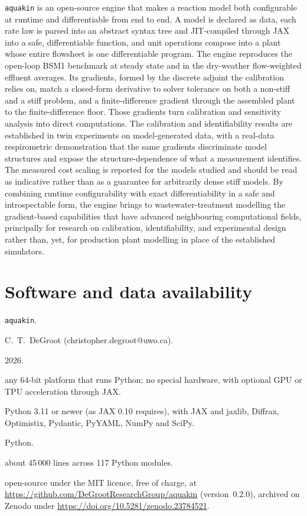 \documentclass{article}
\begin{document}
\texttt{aquakin} is an open-source engine that makes a reaction model both configurable at runtime and differentiable from end to end. A model is declared as data, each rate law is parsed into an abstract syntax tree and JIT-compiled through JAX into a safe, differentiable function, and unit operations compose into a plant whose entire flowsheet is one differentiable program. The engine reproduces the open-loop BSM1 benchmark at steady state and in the dry-weather flow-weighted effluent averages. Its gradients, formed by the discrete adjoint the calibration relies on, match a closed-form derivative to solver tolerance on both a non-stiff and a stiff problem, and a finite-difference gradient through the assembled plant to the finite-difference floor. Those gradients turn calibration and sensitivity analysis into direct computations. The calibration and identifiability results are established in twin experiments on model-generated data, with a real-data respirometric demonstration that the same gradients discriminate model structures and expose the structure-dependence of what a measurement identifies. The measured cost scaling is reported for the models studied and should be read as indicative rather than as a guarantee for arbitrarily dense stiff models. By combining runtime configurability with exact differentiability in a safe and introspectable form, the engine brings to wastewater-treatment modelling the gradient-based capabilities that have advanced neighbouring computational fields, principally for research on calibration, identifiability, and experimental design rather than, yet, for production plant modelling in place of the established simulators.

\section*{Software and data availability}
\begin{description}
\setlength{\itemsep}{0pt}
\item[Name] \texttt{aquakin}.
\item[Developer and contact] C.~T.~DeGroot (christopher.degroot@uwo.ca).
\item[Year first available] 2026.
\item[Hardware required] any 64-bit platform that runs Python; no special hardware, with optional GPU or TPU acceleration through JAX.
\item[Software required] Python 3.11 or newer (as JAX 0.10 requires), with JAX and jaxlib, Diffrax, Optimistix, Pydantic, PyYAML, NumPy and SciPy.
\item[Program language] Python.
\item[Program size] about 45\,000 lines across 117 Python modules.
\item[Availability and cost] open-source under the MIT licence, free of charge, at \url{https://github.com/DeGrootResearchGroup/aquakin} (version~0.2.0), archived on Zenodo under \url{https://doi.org/10.5281/zenodo.23784521}.
\end{description}
\end{document}
